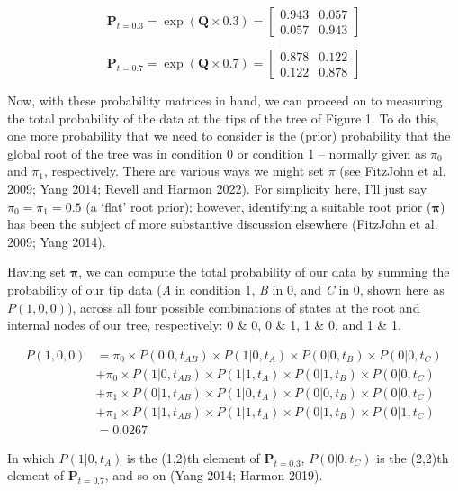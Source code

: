 \documentclass{article}
\begin{document}
\[\mathbf{P}_{t=0.3} = \exp({\mathbf{Q} \times 0.3}) = \begin{bmatrix}0.943 & 0.057\\0.057 & 0.943\end{bmatrix}\]

\[\mathbf{P}_{t=0.7} = \exp({\mathbf{Q} \times 0.7}) = \begin{bmatrix}0.878 & 0.122\\0.122 & 0.878\end{bmatrix}\]

Now, with these probability matrices in hand, we can proceed on to measuring the total probability of the data at the tips of the tree of Figure 1. To do this, one more probability that we need to consider is the (prior) probability that the global root of the tree was in condition 0 or condition 1 -- normally given as \(\pi_{0}\) and \(\pi_{1}\), respectively. There are various ways we might set \(\pi\) (see FitzJohn et al. 2009; Yang 2014; Revell and Harmon 2022). For simplicity here, I'll just say \(\pi_{0} = \pi_{1} = 0.5\) (a `flat' root prior); however, identifying a suitable root prior (\(\mathbf{\pi}\)) has been the subject of more substantive discussion elsewhere (FitzJohn et al. 2009; Yang 2014).

Having set \(\mathbf{\pi}\), we can compute the total probability of our data by summing the probability of our tip data (\emph{A} in condition 1, \emph{B} in 0, and \emph{C} in 0, shown here as \(P(1,0,0)\)), across all four possible combinations of states at the root and internal nodes of our tree, respectively: 0 \& 0, 0 \& 1, 1 \& 0, and 1 \& 1.

\[\begin{aligned}
P(1,0,0) &= \pi_{0} \times P(0|0,t_{AB}) \times P(1|0,t_{A}) \times P(0|0,t_{B}) \times P(0|0,t_{C})\\ 
            & + \pi_{0} \times P(1|0,t_{AB}) \times P(1|1,t_{A}) \times P(0|1,t_{B}) \times P(0|0,t_{C})\\
            & + \pi_{1} \times P(0|1,t_{AB}) \times P(1|0,t_{A}) \times P(0|0,t_{B}) \times P(0|0,t_{C})\\
            & + \pi_{1} \times P(1|1,t_{AB}) \times P(1|1,t_{A}) \times P(0|1,t_{B}) \times P(0|1,t_{C})\\
            & = 0.0267
\end{aligned}\]

In which \(P(1|0,t_{A})\) is the (1,2)th element of \(\mathbf{P}_{t=0.3}\), \(P(0|0,t_{C})\) is the (2,2)th element of \(\mathbf{P}_{t=0.7}\), and so on (Yang 2014; Harmon 2019).
\end{document}
